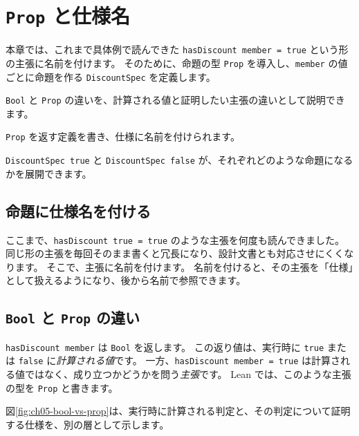 \chapter{\texttt{Prop} と仕様名}
\label{chap:ch05_prop_and_specs}

\begin{chapterabstract}
本章では、これまで具体例で読んできた \texttt{hasDiscount member = true} という形の主張に名前を付けます。
そのために、命題の型 \texttt{Prop} を導入し、\texttt{member} の値ごとに命題を作る \texttt{DiscountSpec} を定義します。
\end{chapterabstract}

\begin{learninggoals}
\item \texttt{Bool} と \texttt{Prop} の違いを、計算される値と証明したい主張の違いとして説明できます。
\item \texttt{Prop} を返す定義を書き、仕様に名前を付けられます。
\item \texttt{DiscountSpec true} と \texttt{DiscountSpec false} が、それぞれどのような命題になるかを展開できます。
\end{learninggoals}

\section{命題に仕様名を付ける}

ここまで、\texttt{hasDiscount true = true} のような主張を何度も読んできました。
同じ形の主張を毎回そのまま書くと冗長になり、設計文書とも対応させにくくなります。
そこで、主張に名前を付けます。
名前を付けると、その主張を「仕様」として扱えるようになり、後から名前で参照できます。

\section{\texttt{Bool} と \texttt{Prop} の違い}

\texttt{hasDiscount member} は \texttt{Bool} を返します。
この返り値は、実行時に \texttt{true} または \texttt{false} に\emph{計算される値}です。
一方、\texttt{hasDiscount member = true} は計算される値ではなく、成り立つかどうかを問う\emph{主張}です。
Lean では、このような主張の型を \texttt{Prop} と書きます。

図\ref{fig:ch05-bool-vs-prop}は、実行時に計算される判定と、その判定について証明する仕様を、別の層として示します。

